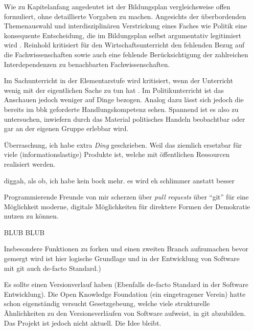 Wie zu Kapitelanfang angedeutet ist der Bildungsplan vergleichsweise offen formuliert, ohne detaillierte Vorgaben zu machen. Angesichts der überbordenden Themenauswahl und interdisziplinären Verstrickung eines Faches wie Politik eine konsequente Entscheidung, die im Bildungsplan selbst argumentativ legitimiert wird \autocite[diggah, welche Seite habe ich das gelesen]{bplan}. Reinhold \textcite[17-18]{Hedtke2016} kritisiert für den Wirtschaftsunterricht den fehlenden Bezug auf die Fachwissenschaften sowie auch eine fehlende Berücksichtigung der zahlreichen Interdependenzen zu benachbarten Fachwissenschaften. 















Im Sachunterricht in der Elementarstufe wird kritisiert, wenn der Unterricht wenig mit der eigentlichen Sache zu tun hat \autocite[2-4]{Scholz2004}. Im Politikunterricht ist das Anschauen jedoch weniger auf Dinge bezogen. Analog dazu lässt sich jedoch die bereits im \gls{bbk} geforderte Handlungskompetenz sehen. Spannend ist es also zu untersuchen, inwiefern durch das Material politisches Handeln beobachtbar oder gar an der eigenen Gruppe erlebbar wird.







    \item 
    \item Überraschung, ich habe extra \emph{Ding} geschrieben. Weil das ziemlich ersetzbar für viele (informationslastige) Produkte ist, welche mit öffentlichen Ressourcen realisiert werden.
    \item diggah, als ob, ich habe kein bock mehr. es wird eh schlimmer anstatt besser

Programmierende Freunde von mir scherzen über \emph{pull requests} über \enquote{git} für eine Möglichkeit moderne, digitale Möglichkeiten für direktere Formen der Demokratie nutzen zu können.



BLUB BLUB





Insbesondere Funktionen zu forken und einen zweiten Branch aufzumachen bevor gemergt wird ist hier logische Grundlage und in der Entwicklung von Software mit git auch de-facto Standard.)
    \item Es sollte einen Versionverlauf haben (Ebenfalls de-facto Standard in der Software Entwicklung). Die Open Knowledge Foundation (ein eingetragener Verein) hatte schon eigenständig versucht Gesetzgebeung, welche viele strukturelle Ähnlichkeiten zu den Versionsverläufen von Software aufweist, in git abzubilden. Das Projekt ist jedoch nicht aktuell. Die Idee bleibt.








